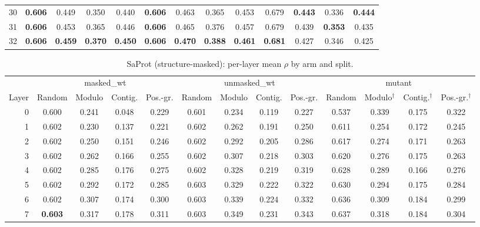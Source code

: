\documentclass[11pt,a4paper]{article}
\begin{document}
\begin{landscape}
\begin{table}[p]
\begin{tabular}{rcccccccccccc}
30 & \textbf{0.606} & 0.449 & 0.350 & 0.440 & \textbf{0.606} & 0.463 & 0.365 & 0.453 & 0.679 & \textbf{0.443} & 0.336 & \textbf{0.444} \\
31 & \textbf{0.606} & 0.453 & 0.365 & 0.446 & \textbf{0.606} & 0.465 & 0.376 & 0.457 & 0.679 & 0.439 & \textbf{0.353} & 0.435 \\
32 & \textbf{0.606} & \textbf{0.459} & \textbf{0.370} & \textbf{0.450} & \textbf{0.606} & \textbf{0.470} & \textbf{0.388} & \textbf{0.461} & \textbf{0.681} & 0.427 & 0.346 & 0.425 \\
\bottomrule
\end{tabular}\end{table}\end{landscape}
\begin{landscape}\begin{table}[p]\centering\footnotesize
\caption{SaProt (structure-masked): per-layer mean $\rho$ by arm and split.}\label{tab:S6}
\begin{tabular}{rcccccccccccc}
\toprule
& \multicolumn{4}{c}{masked\_wt} & \multicolumn{4}{c}{unmasked\_wt} & \multicolumn{4}{c}{mutant} \\
\cmidrule(lr){2-5}\cmidrule(lr){6-9}\cmidrule(lr){10-13}
Layer & Random & Modulo & Contig. & Pos.-gr. & Random & Modulo & Contig. & Pos.-gr. & Random & Modulo$^{\dagger}$ & Contig.$^{\dagger}$ & Pos.-gr.$^{\dagger}$ \\
\midrule
0 & 0.600 & 0.241 & 0.048 & 0.229 & 0.601 & 0.234 & 0.119 & 0.227 & 0.537 & 0.339 & 0.175 & 0.322 \\
1 & 0.602 & 0.230 & 0.137 & 0.221 & 0.602 & 0.262 & 0.191 & 0.250 & 0.611 & 0.254 & 0.172 & 0.245 \\
2 & 0.602 & 0.250 & 0.151 & 0.246 & 0.602 & 0.292 & 0.205 & 0.286 & 0.617 & 0.274 & 0.171 & 0.263 \\
3 & 0.602 & 0.262 & 0.166 & 0.255 & 0.602 & 0.307 & 0.218 & 0.303 & 0.620 & 0.276 & 0.175 & 0.263 \\
4 & 0.602 & 0.285 & 0.176 & 0.275 & 0.602 & 0.328 & 0.219 & 0.319 & 0.628 & 0.289 & 0.166 & 0.276 \\
5 & 0.602 & 0.292 & 0.172 & 0.285 & 0.603 & 0.329 & 0.222 & 0.322 & 0.630 & 0.294 & 0.175 & 0.284 \\
6 & 0.602 & 0.307 & 0.174 & 0.300 & 0.603 & 0.339 & 0.224 & 0.332 & 0.636 & 0.309 & 0.184 & 0.299 \\
7 & \textbf{0.603} & 0.317 & 0.178 & 0.311 & 0.603 & 0.349 & 0.231 & 0.343 & 0.637 & 0.318 & 0.184 & 0.304 \\
\midrule

\end{tabular}
\end{table}
\end{landscape}
\end{document}
